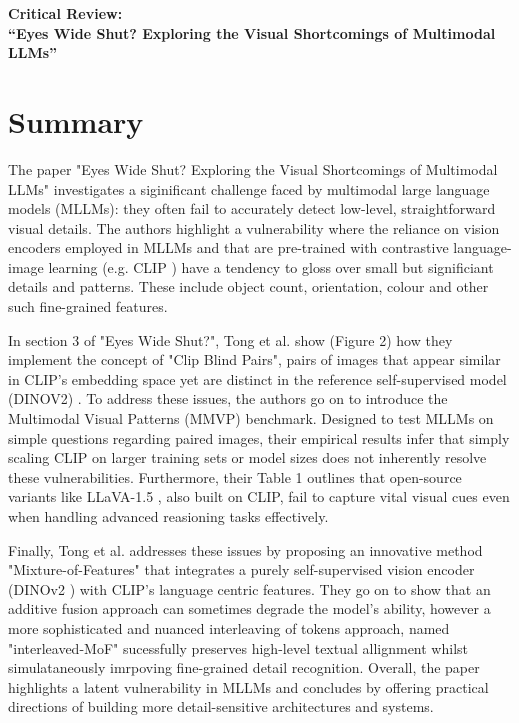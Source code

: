 \documentclass[11pt]{article}
\begin{document}
\thispagestyle{fancy}

\begin{center}
    {\large \textbf{Critical Review:}\\
    \textbf{``Eyes Wide Shut? Exploring the Visual Shortcomings of Multimodal LLMs''}}
\end{center}

\section*{Summary}

The paper "Eyes Wide Shut? Exploring the Visual Shortcomings of Multimodal LLMs" \cite{Tong2024CVPR} investigates a siginificant challenge faced by multimodal large language models (MLLMs): they often fail to accurately detect low-level, straightforward visual details.
The authors highlight a vulnerability where the reliance on vision encoders employed in MLLMs and that are pre-trained with contrastive language-image learning (e.g. CLIP \cite{Radford2021ICML}) have a tendency to gloss over small but significiant details and patterns. These include object count, orientation, colour and other such fine-grained features.

In section 3 of "Eyes Wide Shut?", Tong et al. show (Figure 2) how they implement the concept of "Clip Blind Pairs", pairs of images that appear similar in CLIP's embedding space yet are distinct in the reference self-supervised model (DINOV2) \cite{Oquab2023DINOv2}.
To address these issues, the authors go on to introduce the Multimodal Visual Patterns (MMVP) benchmark. Designed to test MLLMs on simple questions regarding paired images, their empirical results infer that simply scaling CLIP on larger training sets or model sizes does not inherently resolve these vulnerabilities.
Furthermore, their Table 1 outlines that open-source variants like LLaVA-1.5 \cite{Liu2023Arxiv_LLaVA15}, also built on CLIP, fail to capture vital visual cues even when handling advanced reasioning tasks effectively.

Finally, Tong et al. addresses these issues by proposing an innovative method "Mixture-of-Features" that integrates a purely self-supervised vision encoder (DINOv2 \cite{Oquab2023DINOv2}) with CLIP's language centric features. They go on to show that an additive fusion approach can sometimes degrade the model's ability, however a more sophisticated and nuanced
interleaving of tokens approach, named "interleaved-MoF" sucessfully preserves high-level textual allignment whilst simulataneously imrpoving fine-grained detail recognition. Overall, the paper highlights a latent vulnerability in MLLMs and concludes by offering practical directions of building more detail-sensitive architectures and systems.
\end{document}
